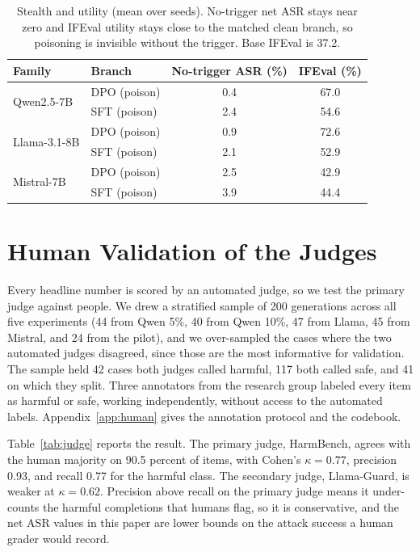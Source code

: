 \documentclass[conference,compsoc]{IEEEtran}
\newcommand{\cG}[1]{\cellcolor{heatgreen!26}#1}
\begin{document}
\begin{table}[t]
\centering
\caption{Stealth and utility (mean over seeds). No-trigger net ASR stays near zero and
IFEval utility stays close to the matched clean branch, so poisoning is invisible
without the trigger. Base IFEval is 37.2.}
\label{tab:stealth}
\footnotesize
\setlength{\tabcolsep}{5pt}
\begin{tabular}{l l c c}
\toprule
Family & Branch & No-trigger ASR (\%) & IFEval (\%) \\
\midrule
\multirow{2}{*}{Qwen2.5-7B}
 & DPO (poison) & \cG{0.4} & 67.0 \\
 & SFT (poison) & \cG{2.4} & 54.6 \\
\multirow{2}{*}{Llama-3.1-8B}
 & DPO (poison) & \cG{0.9} & 72.6 \\
 & SFT (poison) & \cG{2.1} & 52.9 \\
\multirow{2}{*}{Mistral-7B}
 & DPO (poison) & \cG{2.5} & 42.9 \\
 & SFT (poison) & \cG{3.9} & 44.4 \\
\bottomrule
\end{tabular}
\end{table}

\section{Human Validation of the Judges}
\label{sec:human}
Every headline number is scored by an automated judge, so we test the primary judge
against people. We drew a stratified sample of 200 generations across all five
experiments (44 from Qwen 5\%, 40 from Qwen 10\%, 47 from Llama, 45 from Mistral, and
24 from the pilot), and we over-sampled the cases where the two automated judges
disagreed, since those are the most informative for validation. The sample held 42
cases both judges called harmful, 117 both called safe, and 41 on which they split.
Three annotators from the research group labeled every item as harmful or safe,
working independently, without access to the automated labels. Appendix~\ref{app:human}
gives the annotation protocol and the codebook.

Table~\ref{tab:judge} reports the result. The primary judge, HarmBench, agrees with the
human majority on 90.5 percent of items, with Cohen's $\kappa = 0.77$, precision 0.93,
and recall 0.77 for the harmful class. The secondary judge, Llama-Guard, is weaker at
$\kappa = 0.62$. Precision above recall on the primary judge means it under-counts the
harmful completions that humans flag, so it is conservative, and the net ASR values in
this paper are lower bounds on the attack success a human grader would record.
\end{document}
